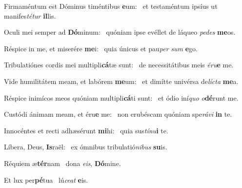 \item Firmaméntum est Dóminus timéntibus \textbf{e}um:~\psstar{} et testaméntum ipsíus ut manifes\textit{té}\textit{tur} \textbf{il}lis.

\item Oculi mei semper ad \textbf{Dó}minum:~\psstar{} quóniam ipse evéllet de láqueo \textit{pe}\textit{des} \textbf{me}os.

\item Réspice in me, et miserére \textbf{me}i:~\psstar{} quia únicus et pau\textit{per} \textit{sum} \textbf{e}go.

\item Tribulatiónes cordis mei multipli\textbf{cá}tæ sunt:~\psstar{} de necessitátibus meis \textit{é}\textit{ru}\textbf{e} me.

\item Vide humilitátem meam, et labórem \textbf{me}um:~\psstar{} et dimítte univérsa de\textit{líc}\textit{ta} \textbf{me}a.

\item Réspice inimícos meos quóniam multipli\textbf{cá}ti sunt:~\psstar{} et ódio iní\textit{quo} \textit{o}\textbf{dé}runt me.

\item Custódi ánimam meam, et éru\textbf{e} me:~\psstar{} non erubéscam quóniam spe\textit{rá}\textit{vi} \textbf{in} te.

\item Innocéntes et recti adhæsérunt \textbf{mi}hi:~\psstar{} quia sus\textit{tí}\textit{nu}\textbf{i} te.

\item Líbera, Deus, \textbf{Is}raël:~\psstar{} ex ómnibus tribulatió\textit{ni}\textit{bus} \textbf{su}is.

\item Réquiem æ\textbf{tér}nam~\psstar{} dona \textit{e}\textit{is}, \textbf{Dó}mine.

\item Et lux per\textbf{pé}tua~\psstar{} lú\textit{ce}\textit{at} \textbf{e}is.